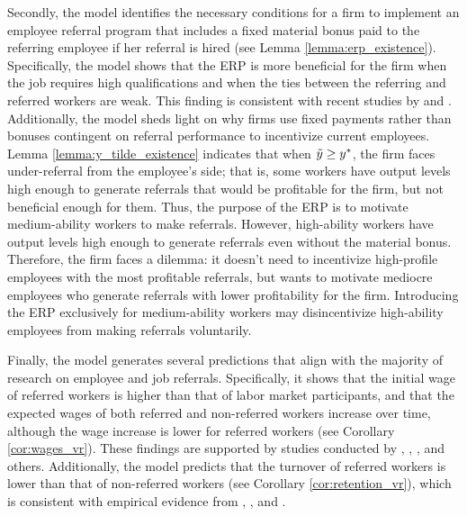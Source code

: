 \documentclass[12pt]{article}
\begin{document}
Secondly, the model identifies the necessary conditions for a firm to implement an employee referral program that includes a fixed material bonus paid to the referring employee if her referral is hired (see Lemma \ref{lemma:erp_existence}). Specifically, the model shows that the ERP is more beneficial for the firm when the job requires high qualifications and when the ties between the referring and referred workers are weak. This finding is consistent with recent studies by \cite{friebel2023employee} and \cite{lester2021heterogeneous}. Additionally, the model sheds light on why firms use fixed payments rather than bonuses contingent on referral performance to incentivize current employees. Lemma \ref{lemma:y_tilde_existence} indicates that when $\Tilde{y} \geq y^*$, the firm faces under-referral from the employee's side; that is, some workers have output levels high enough to generate referrals that would be profitable for the firm, but not beneficial enough for them. Thus, the purpose of the ERP is to motivate medium-ability workers to make referrals. However, high-ability workers have output levels high enough to generate referrals even without the material bonus. Therefore, the firm faces a dilemma: it doesn't need to incentivize high-profile employees with the most profitable referrals, but wants to motivate mediocre employees who generate referrals with lower profitability for the firm. Introducing the ERP exclusively for medium-ability workers may disincentivize high-ability employees from making referrals voluntarily.

Finally, the model generates several predictions that align with the majority of research on employee and job referrals. Specifically, it shows that the initial wage of referred workers is higher than that of labor market participants, and that the expected wages of both referred and non-referred workers increase over time, although the wage increase is lower for referred workers (see Corollary \ref{cor:wages_vr}). These findings are supported by studies conducted by \cite{corcoran1980most}, \cite{montgomery1991social}, \cite{dustmann2016referral}, and others. Additionally, the model predicts that the turnover of referred workers is lower than that of non-referred workers (see Corollary \ref{cor:retention_vr}), which is consistent with empirical evidence from \cite{pallais2016referential}, \cite{lalanne2016old}, and \cite{lalanne2021social}.
\end{document}
